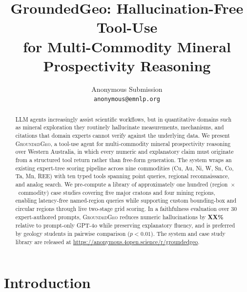 \documentclass[11pt]{article}
\title{GroundedGeo: Hallucination-Free Tool-Use \\
       for Multi-Commodity Mineral Prospectivity Reasoning}
\author{Anonymous Submission \\
  \texttt{anonymous@emnlp.org} \\}
\begin{document}
\maketitle

\begin{abstract}
LLM agents increasingly assist scientific workflows, but in quantitative
domains such as mineral exploration they routinely hallucinate
measurements, mechanisms, and citations that domain experts cannot verify
against the underlying data. We present \textsc{GroundedGeo}, a tool-use
agent for multi-commodity mineral prospectivity reasoning over Western
Australia, in which every numeric and explanatory claim must originate
from a structured tool return rather than free-form generation.
The system wraps an existing expert-tree scoring pipeline across nine
commodities (Cu, Au, Ni, W, Sn, Co, Ta, Mn, REE) with ten typed tools
spanning point queries, regional reconnaissance, and analog search.
We pre-compute a library of approximately one hundred
(region~$\times$~commodity) case studies covering five major cratons and
four mining regions, enabling latency-free named-region queries while
supporting custom bounding-box and circular regions through live
two-stage grid scoring. In a faithfulness evaluation over 30
expert-authored prompts, \textsc{GroundedGeo} reduces numeric
hallucinations by \textbf{XX\%} relative to prompt-only GPT-4o while
preserving explanatory fluency, and is preferred by geology students in
pairwise comparison ($p < 0.01$). The system and case study library are
released at \url{https://anonymous.4open.science/r/groundedgeo}.
\end{abstract}

\section{Introduction}
\label{sec:intro}
\end{document}
